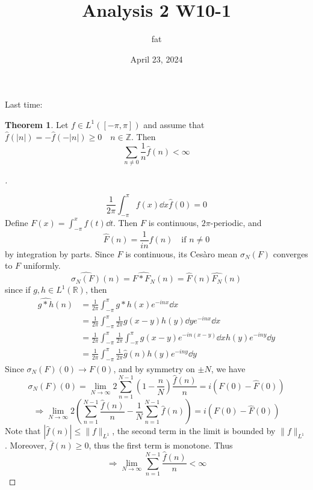 \documentclass{article}
\title{Analysis 2 W10-1}
\author{fat}
\date{April 23, 2024}
\theoremstyle{definition}
\newtheorem{thm}{Theorem}
\newenvironment{proofs}[1][\proofname]{%
  \begin{proof}[#1]$ $\par\nobreak\ignorespaces
}{%
  \end{proof}
}
\newcommand{\RR}{\mathbb R}
\newcommand{\ZZ}{\mathbb Z}
\newcommand{\Ra}{\Rightarrow}
\begin{document}
\maketitle
\thispagestyle{fancy}
\renewcommand{\footrulewidth}{0.4pt}
\cfoot{\thepage}
\renewcommand{\headrulewidth}{0.4pt}

Last time:
\begin{thm}
	Let $f \in L^1([-\pi, \pi])$ and assume that $\hat{f}(|n|) = - \hat{f}(-|n|) \geq 0 \quad n \in \ZZ$.
	Then 
	\[
		\sum_{n \neq 0} \frac{1}{n} \hat{f}(n) < \infty
	\]
\end{thm}

\begin{proofs}
	\[
		\frac{1}{2 \pi} \int_{-\pi}^\pi f(x) \dd{x} \hat{f}(0) = 0
	\]
	Define $F(x) = \int_{-\pi}^x f(t) \dd{t}$.
	Then $F$ is continuous, $2 \pi$-periodic, and 
	\[
		\hat{F}(n) = \frac{1}{in} \hat{f}(n) \quad \text{if }n \neq 0
	\]
	by integration by parts.
	Since $F$ is continuous, its Ces\`aro mean $\sigma_N(F)$ converges to $F$ uniformly.
	\[
		\widehat{\sigma_N(F)}(n) = \widehat{F * F_N}(n) = \widehat{F}(n) \widehat{F_N}(n)
	\]
	since if $g, h \in L^1(\RR)$, then
	\[
		\begin{split}
			\widehat{g * h}(n) & = \frac{1}{2 \pi} \int_{- \pi}^\pi g * h(x) e^{-inx} \dd{x}\\
			& = \frac{1}{2 \pi} \int_{- \pi}^{\pi} \frac{1}{2 \pi} g(x - y) h(y) \dd{y} e^{-inx} \dd{x}\\
			& = \frac{1}{2 \pi} \int_{- \pi}^\pi \frac{1}{2 \pi} \int_{- \pi}^\pi g(x - y) e^{-in (x - y)} \dd{x} h(y) e^{-iny} \dd{y}\\
			& = \frac{1}{2 \pi} \int_{- \pi}^\pi \frac{1}{2 \pi} \widehat{g}(n) h(y) e^{- iny} \dd{y}
		\end{split}
	\]
	Since $\sigma_N(F)(0) \to F(0)$, and by symmetry on $\pm N$, we have
	\[
		\sigma_N(F)(0) = \lim_{N \to \infty} 2 \sum_{n = 1}^{N - 1} \left(1 - \frac{n}{N} \right) \frac{\widehat{f}(n)}{n} = i (F(0) - \widehat{F}(0))
	\]
	\[
		\Ra \lim_{N \to \infty} 2 \left( \sum_{n  = 1}^{N - 1} \frac{\widehat{f}(n)}{n} - \frac{1}{N} \sum_{n = 1}^{N - 1} \widehat{f}(n) \right) = i(F(0) - \widehat{F}(0))
	\]
	Note that $|\widehat{f}(n)| \leq \|f\|_{L^1}$, the second term in the limit is bounded by $\|f\|_{L^1}$.
	Moreover, $\hat{f}(n) \geq 0$, thus the first term is monotone.
	Thus 
	\[
		\Ra \lim_{N \to \infty} \sum_{n = 1}^{N - 1} \frac{\widehat{f}(n)}{n} < \infty
	\]

\end{proofs}
\end{document}
